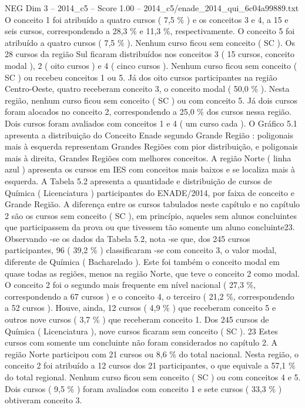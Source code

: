 \begin{textsample}{NEG Dim 3 – 2014\_c5 – Score 1.00 – 2014\_c5/enade\_2014\_qui\_6c04a99889.txt}
O conceito 1 foi atribuído a quatro cursos ( 7,5 \% ) e os conceitos 3 e 4, a 15 e seis cursos, correspondendo a 28,3 \% e 11,3 \%, respectivamente.
O conceito 5 foi atribuído a quatro cursos ( 7,5 \% ).
Nenhum curso ficou sem conceito ( SC ).
Os 28 cursos da região Sul ficaram distribuídos nos conceitos 3 ( 15 cursos, conceito modal ), 2 ( oito cursos ) e 4 ( cinco cursos ).
Nenhum curso ficou sem conceito ( SC ) ou recebeu conceitos 1 ou 5.
Já dos oito cursos participantes na região Centro-Oeste, quatro receberam conceito 3, o conceito modal ( 50,0 \% ).
Nesta região, nenhum curso ficou sem conceito ( SC ) ou com conceito 5.
Já dois cursos foram alocados no conceito 2, correspondendo a 25,0 \% dos cursos nessa região.
Dois cursos foram avaliados com conceitos 1 e 4 ( um curso cada ).
O Gráfico 5.1 apresenta a distribuição do Conceito Enade segundo Grande Região : poligonais mais à esquerda representam Grandes Regiões com pior distribuição, e poligonais mais à direita, Grandes Regiões com melhores conceitos.
A região Norte ( linha azul ) apresenta os cursos em IES com conceitos mais baixos e se localiza mais à esquerda.
A Tabela 5.2 apresenta a quantidade e distribuição de cursos de Química ( Licenciatura ) participantes do ENADE/2014, por faixa de conceito e Grande Região.
A diferença entre os cursos tabulados neste capítulo e no capítulo 2 são os cursos sem conceito ( SC ), em princípio, aqueles sem alunos concluintes que participassem da prova ou que tivessem tão somente um aluno concluinte23.
Observando -se os dados da Tabela 5.2, nota -se que, dos 245 cursos participantes, 96 ( 39,2 \% ) classificaram -se com conceito 3, o valor modal, diferente de Química ( Bacharelado ).
Este foi também o conceito modal em quase todas as regiões, menos na região Norte, que teve o conceito 2 como modal.
O conceito 2 foi o segundo mais frequente em nível nacional ( 27,3 \%, correspondendo a 67 cursos ) e o conceito 4, o terceiro ( 21,2 \%, correspondendo a 52 cursos ).
Houve, ainda, 12 cursos ( 4,9 \% ) que receberam conceito 5 e outros nove cursos ( 3,7 \% ) que receberam conceito 1.
Dos 245 cursos de Química ( Licenciatura ), nove cursos ficaram sem conceito ( SC ). 23 Estes cursos com somente um concluinte não foram considerados no capítulo 2.
A região Norte participou com 21 cursos ou 8,6 \% do total nacional.
Nesta região, o conceito 2 foi atribuído a 12 cursos dos 21 participantes, o que equivale a 57,1 \% do total regional.
Nenhum curso ficou sem conceito ( SC ) ou com conceitos 4 e 5.
Dois cursos ( 9,5 \% ) foram avaliados com conceito 1 e sete cursos ( 33,3 \% ) obtiveram conceito 3.

\end{textsample}
